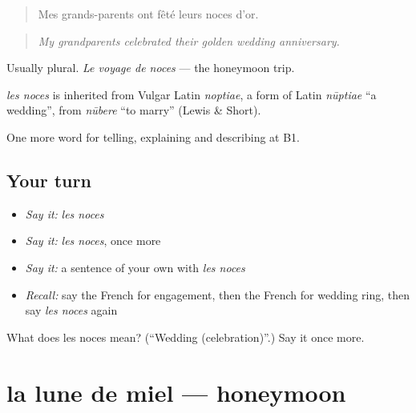 \begin{quote}
Mes grands-parents ont fêté leurs noces d'or.
\end{quote}

\begin{quote}
\emph{My grandparents celebrated their golden wedding anniversary.}
\end{quote}

Usually plural. \emph{Le voyage de noces} — the honeymoon trip.

\begin{cousinweb}
\emph{les noces} is inherited from Vulgar Latin \emph{noptiae}, a form of Latin \emph{nūptiae} \textquotedblleft{}a wedding\textquotedblright{}, from \emph{nūbere} \textquotedblleft{}to marry\textquotedblright{} (Lewis \& Short).
\end{cousinweb}

\begin{grammarlens}[title={What you've built}]
One more word for telling, explaining and describing at B1.
\end{grammarlens}

\subsection*{Your turn}
\begin{itemize}
\raggedright
  \item \emph{Say it:} \emph{les noces}
  \item \emph{Say it:} \emph{les noces}, once more
  \item \emph{Say it:} a sentence of your own with \emph{les noces}
  \item \emph{Recall:} say the French for engagement, then the French for wedding ring, then say \emph{les noces} again
\end{itemize}

\begin{tcolorbox}[breakable,colback=teal!4,colframe=teal!35!black,title={Before you move on}]
What does les noces mean? (\textquotedblleft{}Wedding (celebration)\textquotedblright{}.) Say it once more.
\end{tcolorbox}
\section[la lune de miel]{la lune de miel — honeymoon}

\label{lesson:FR-C489-lune-de-miel}



